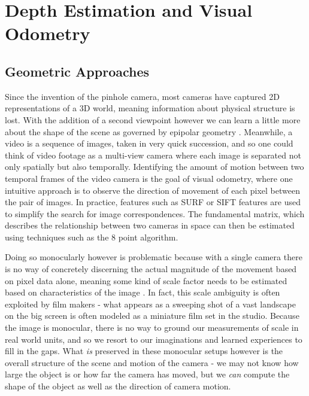 \documentclass[openany]{book}
\begin{document}
\section{Depth Estimation and Visual Odometry}


\subsection{Geometric Approaches}

Since the invention of the pinhole camera, most cameras have captured 2D representations of a 3D world, meaning information about physical structure is lost. With the addition of a second viewpoint however we can learn a little more about the shape of the scene as governed by epipolar geometry \cite{zisserman2004multiview}. Meanwhile, a video is a sequence of images, taken in very quick succession, and so one could think of video footage as a multi-view camera where each image is separated not only spatially but also temporally. Identifying the amount of motion between two temporal frames of the video camera is the goal of visual odometry, where one intuitive approach is to observe the direction of movement of each pixel between the pair of images. In practice, features such as SURF \cite{bay2008surf} or SIFT \cite{lowe2004sift} features are used to simplify the search for image correspondences. The fundamental matrix, which describes the relationship between two cameras in space can then be estimated using techniques such as the 8 point algorithm. 

Doing so monocularly however is problematic because with a single camera there is no way of concretely discerning the actual magnitude of the movement based on pixel data alone, meaning some kind of scale factor needs to be estimated based on characteristics of the image \cite{gakne2018scale, nister2004vo, zhou2016scale, zhou2019scale}. In fact, this scale ambiguity is often exploited by film makers - what appears as a sweeping shot of a vast landscape on the big screen is often modeled as a miniature film set in the studio. Because the image is monocular, there is no way to ground our measurements of scale in real world units, and so we resort to our imaginations and learned experiences to fill in the gaps. What \textit{is} preserved in these monocular setups however is the overall structure of the scene and motion of the camera - we may not know how large the object is or how far the camera has moved, but we \textit{can} compute the  shape of the object as well as the direction of camera motion. 
\end{document}
